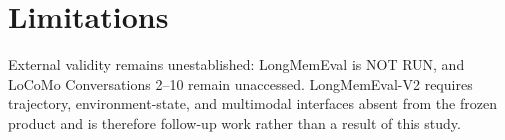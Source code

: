 \section{Limitations}

External validity remains unestablished: LongMemEval is NOT RUN, and LoCoMo
Conversations 2--10 remain unaccessed. LongMemEval-V2 requires trajectory,
environment-state, and multimodal interfaces absent from the frozen product
and is therefore follow-up work rather than a result of this study.
